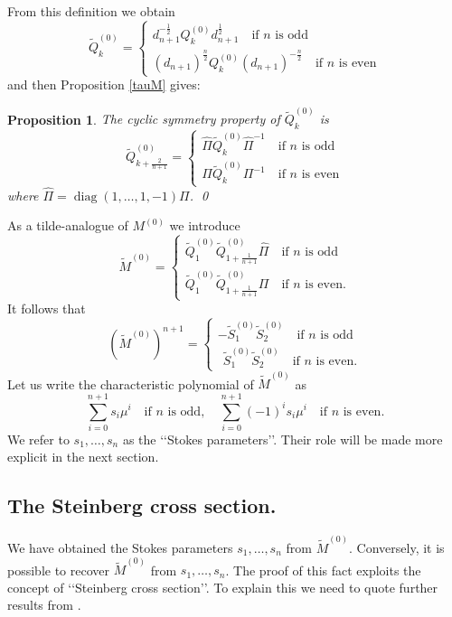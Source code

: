 \documentclass[a4paper,12pt,leqno]{amsart}
\numberwithin{equation}{section}
\theoremstyle{plain}
\newtheorem{proposition}[theorem]{Proposition}
\theoremstyle{definition}
\newcommand{\om}{\omega}
\DeclareMathOperator{\diag}{diag}
\renewcommand{\ll}{\lq\lq}
\newcommand{\rrr}{\rq\rq}
\newcommand{\Qz}{  Q^{(0)}  }
\newcommand{\Mz}{ M^{(0)}  }
\newcommand{\tSz}{  \tilde S^{(0)}  }
\newcommand{\tQz}{  \tilde Q^{(0)}  }
\newcommand{\tMz}{  \tilde M^{(0)}  }
\begin{document}
From this definition we obtain
\begin{equation}\label{tQz}
\tQz_k=
\begin{cases}
d_{n+1}^{-\frac12} \Qz_k d_{n+1}^{\frac12} \quad\text{if $n$ is odd}
\\
 (d_{n+1})^{\frac n2} \Qz_k (d_{n+1})^{-\frac n2} \quad\text{if $n$ is even}
\end{cases}
\end{equation}
and then Proposition \ref{tauM} gives:

\begin{proposition}\label{tauMtilde} The cyclic symmetry property of $\tQz_k$ is
\[
\tQz_{k+\scriptstyle\frac2{n+1}} =
\begin{cases}
\hat\Pi \tQz_k \hat\Pi^{-1}
\quad\text{if $n$ is odd}
\\
\Pi \tQz_{k} \Pi^{-1}\quad\text{if $n$ is even}
\end{cases}
\]
where
$\hat\Pi
=\diag(1,\dots,1,-1)\Pi$.
\qed
\end{proposition}
As a tilde-analogue of $\Mz$ we introduce
\begin{equation}\label{tMz}
\tMz=
\begin{cases}
\tQz_1\tQz_{1+\scriptstyle\frac1{n+1}}\hat\Pi
\quad\text{if $n$ is odd}
\\
\tQz_1\tQz_{1+\scriptstyle\frac1{n+1}}
\Pi
\quad\text{if $n$ is even.}
\end{cases}
\end{equation}
It follows that
\begin{equation}\label{tMz^n+1}
(\tMz)^{n+1}=
\begin{cases}
 -\tSz_1 \tSz_2 \quad\text{if $n$ is odd}
\\
\ \ \tSz_1 \tSz_2 \quad\text{if $n$ is even.}
\end{cases}
\end{equation}
Let us write the characteristic polynomial of $\tMz$ as
\[
\sum_{i=0}^{n+1} s_i \mu^{i} \quad\text{if $n$ is odd},
\quad
\sum_{i=0}^{n+1} (-1)^is_i \mu^{i} \quad\text{if $n$ is even.}
\]
We refer to $s_1,\dots,s_n$ as the \ll Stokes parameters\rrr. Their role will be made
more explicit in the next section.


\subsection{The Steinberg cross section.}\label{steinberg}

We have obtained the Stokes parameters $s_1,\dots,s_n$ from $\tMz$.
Conversely, it is possible to recover $\tMz$ from  $s_1,\dots,s_n$.
The proof of this fact exploits the concept of \ll Steinberg cross section\rrr.
To explain this we need to quote further results from
\cite{GH1}.
\end{document}

